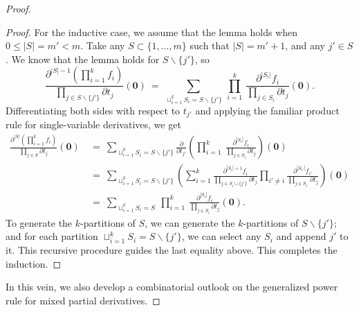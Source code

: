 \documentclass[12pt, reqno, oneside]{amsart}
\numberwithin{equation}{section}
\begin{document}
\begin{proof}
\begin{proof}
For the inductive case, we assume that the lemma holds when $0\leq|S|=m'<m$. Take any $S\subset\{1, \dots, m\}$ such that $|S|=m'+1$, and any $j'\in S$. We know that the lemma holds for $S\backslash\{j'\}$, so
\begin{equation}
\frac{\partial^{|S|-1}\left(\prod_{i=1}^k f_i\right)}{\prod_{j \in S\backslash\{j'\} }\partial t_j}(\mathbf{0}) \ = \ \sum_{\sqcup_{i=1}^k S_i = S\backslash\{j'\}} \ \prod_{i=1}^k \  \frac{\partial^{|S_i|} f_i}{\prod_{j \in S_i }\partial t_j}(\mathbf{0}).
\end{equation}
Differentiating both sides with respect to $t_{j'}$ and applying the familiar product rule for single-variable derivatives, we get
\begin{align}\label{eq:ind-prod-rule}
\nonumber
\frac{\partial^{|S|}\left(\prod_{i=1}^k f_i\right)}{\prod_{j \in S}\partial t_j}(\mathbf{0}) \ &= \ \sum_{\sqcup_{i=1}^k S_i = S\backslash\{j'\}} \frac{\partial}{\partial t_{j'}}\left(\prod_{i=1}^k \  \frac{\partial^{|S_i|} f_i}{\prod_{j \in S_i }\partial t_j}\right)(\mathbf{0}) \\
\nonumber
&= \ \sum_{\sqcup_{i=1}^k S_i = S\backslash\{j'\}}\left(\sum_{i=1}^k \frac{\partial^{|S_{i}|+1} f_{i}}{\prod\limits_{j \in S_{i}\cup\{j'\}}\partial t_j}\prod_{i' \neq i}\frac{\partial^{|S_{i'}|} f_{i'}}{\prod_{j \in S_{i'} }\partial t_j}\right)(\mathbf{0}) \\
&= \ \sum_{\sqcup_{i=1}^k S_i = S} \ \prod_{i=1}^k \ \frac{\partial^{|S_i|} f_i}{\prod_{j \in S_i}\partial t_j}(\mathbf{0}).
\end{align}
To generate the $k$-partitions of $S$, we can generate the $k$-partitions of $S\backslash\{j'\}$; and for each partition $\sqcup_{i=1}^k S_i = S\backslash\{j'\}$, we can select any $S_{i}$ and append $j'$ to it. This recursive procedure guides the last equality above. This completes the induction. 
\end{proof}

In this vein, we also develop a combinatorial outlook on the generalized power rule for mixed partial derivatives. 


\end{proof}
\end{document}
